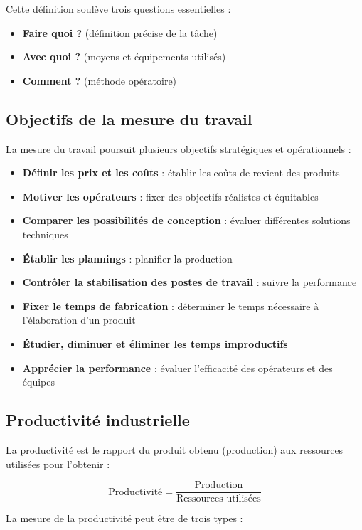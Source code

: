 \documentclass[a4paper,12pt]{article}
\begin{document}
Cette définition soulève trois questions essentielles :
\begin{itemize}
    \item \textbf{Faire quoi ?} (définition précise de la tâche)
    \item \textbf{Avec quoi ?} (moyens et équipements utilisés)
    \item \textbf{Comment ?} (méthode opératoire)
\end{itemize}

\subsection{Objectifs de la mesure du travail}

La mesure du travail poursuit plusieurs objectifs stratégiques et opérationnels :

\begin{itemize}
    \item \textbf{Définir les prix et les coûts} : établir les coûts de revient des produits
    \item \textbf{Motiver les opérateurs} : fixer des objectifs réalistes et équitables
    \item \textbf{Comparer les possibilités de conception} : évaluer différentes solutions techniques
    \item \textbf{Établir les plannings} : planifier la production
    \item \textbf{Contrôler la stabilisation des postes de travail} : suivre la performance
    \item \textbf{Fixer le temps de fabrication} : déterminer le temps nécessaire à l'élaboration d'un produit
    \item \textbf{Étudier, diminuer et éliminer les temps improductifs}
    \item \textbf{Apprécier la performance} : évaluer l'efficacité des opérateurs et des équipes
\end{itemize}

\subsection{Productivité industrielle}

La productivité est le rapport du produit obtenu (production) aux ressources utilisées pour l'obtenir :

\[
\text{Productivité} = \frac{\text{Production}}{\text{Ressources utilisées}}
\]

La mesure de la productivité peut être de trois types :
\end{document}
